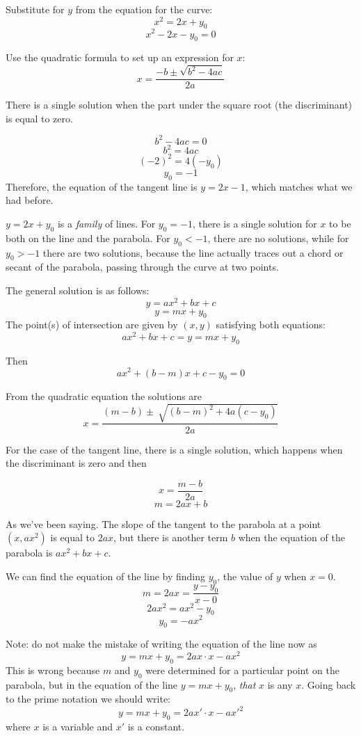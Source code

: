 \documentclass[11pt, oneside]{article}
\begin{document}
Substitute for $y$ from the equation for the curve:
\[ x^2 = 2x + y_0 \]
\[ x^2 - 2x - y_0 = 0 \]

Use the quadratic formula to set up an expression for $x$:
\[ x = \frac{-b \pm \sqrt{b^2 - 4ac}}{2a} \]

There is a single solution when the part under the square root (the discriminant) is equal to zero.

\[ b^2 - 4ac = 0 \]
\[ b^2 = 4ac \]
\[ (-2)^2 = 4(-y_0) \]
\[ y_0 = -1 \]
Therefore, the equation of the tangent line is $y = 2x - 1$, which matches what we had before.

$y = 2x + y_0$ is a \emph{family} of lines.  For $y_0 = -1$, there is a single solution for $x$ to be both on the line and the parabola.  For $y_0 < -1$, there are no solutions, while for $y_0 > -1$ there are two solutions, because the line actually traces out a chord or secant of the parabola, passing through the curve at two points.

The general solution is as follows:
\[ y = ax^2 + bx + c \]
\[ y = mx + y_0 \]
The point(s) of intersection are given by $(x,y)$ satisfying both equations:
\[ ax^2 + bx + c = y = mx + y_0 \]

Then
\[ ax^2 + (b-m) x + c - y_0 = 0 \]

From the quadratic equation the solutions are
\[ x = \frac{(m-b) \pm \ \sqrt{(b-m)^2 + 4a(c-y_0)}}{2a} \]

For the case of the tangent line, there is a single solution, which happens when the discriminant is zero and then

\[ x = \frac{m-b}{2a} \]
\[ m = 2ax + b \]

As we've been saying.  The slope of the tangent to the parabola at a point $(x, ax^2)$ is equal to $2ax$, but there is another term $b$ when the equation of the parabola is $ax^2 + bx + c$.

We can find the equation of the line by finding $y_0$, the value of $y$ when $x = 0$.
\[ m = 2ax = \frac{y - y_0}{x - 0} \]
\[ 2ax^2 = ax^2 - y_0 \]
\[ y_0 = -ax^2 \]

Note:  do not make the mistake of writing the equation of the line now as
\[ y = mx + y_0 = 2ax \cdot x - ax^2 \]
This is wrong because $m$ and $y_0$ were determined for a particular point on the parabola, but in the equation of the line $y = mx + y_0$, \emph{that} $x$ is any $x$.  Going back to the prime notation we should write:
\[ y = mx + y_0 = 2ax' \cdot x - ax'^2 \]
where $x$ is a variable and $x'$ is a constant.
\end{document}
